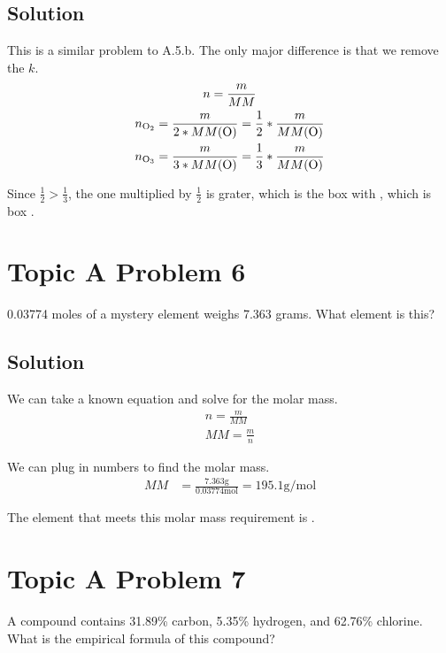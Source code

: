 \documentclass[10pt]{article}
\begin{document}
        \subsection{Solution}
            This is a similar problem to A.5.b.
            The only major difference is that we remove the $k$.
            \begin{gather}
                n   =   \frac{m}{MM}\\
                n_{\ce{O2}} =   \frac{m}{2 * MM(\ce{O})} = \frac{1}{2} * \frac{m}{MM(\ce{O})}\\
                n_{\ce{O3}} =   \frac{m}{3 * MM(\ce{O})} = \frac{1}{3} * \frac{m}{MM(\ce{O})}
            \end{gather}

            Since $\frac{1}{2} > \frac{1}{3}$, the one multiplied by $\frac{1}{2}$ is grater, which is the box with , which is box .


    \pagebreak
    \section{Topic A Problem 6}
        0.03774 moles of a mystery element weighs 7.363 grams. What element is this? 
            
        \subsection{Solution}
            We can take a known equation and solve for the molar mass.
            \begin{gather}
                n   =   \frac{m}{MM}\\
                MM  =   \frac{m}{n}
            \end{gather}

            We can plug in numbers to find the molar mass.
            \begin{align}
                MM  &=  \frac{7.363 \unit{\gram}}{0.03774 \unit{\mole}}
                    =   195.1 \unit{\gram/\mole}
            \end{align}

            The element that meets this molar mass requirement is . 

    \pagebreak
    \section{Topic A Problem 7}
        A compound contains 31.89\% carbon, 5.35\% hydrogen, and 62.76\% chlorine. 
        What is the empirical formula of this compound?
        
\end{document}
